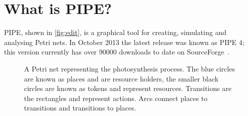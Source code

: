 \section{What is PIPE?}
PIPE, shown in \cref{fig:edit}, is a graphical tool for creating, simulating and analysing Petri nets. In October 2013 the latest release was known as PIPE 4; this version currently has over \num{90000} downloads to date on SourceForge~\cite{downloads}. 


\begin{figure}[H]

\caption{A Petri net representing the photosynthesis process. The blue circles are known as places and are resource holders, the smaller black circles are known as tokens and represent resources. Transitions are the rectangles and represent actions. Arcs connect places to transitions and transitions to places.}
\label{tikz:photo}
\end{figure}

